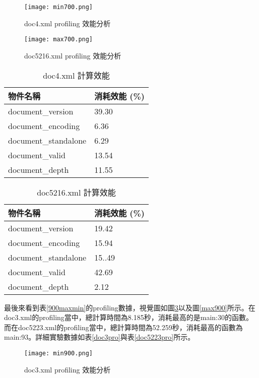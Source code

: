 \begin{figure}[H]
\centering
\graphicspath{{/Users/FUDA/Documents/masterThesis/image/}}
\texttt{[image: min700.png]}
\caption{doc4.xml profiling 效能分析}
\label{min700}
\end{figure}

\begin{figure}[H]
\centering
\graphicspath{{/Users/FUDA/Documents/masterThesis/image/}}
\texttt{[image: max700.png]}
\caption{doc5216.xml profiling 效能分析}
\label{max700}
\end{figure}


\begin{table}[H]
\caption{doc4.xml 計算效能}
\label{doc4pro}
\begin{center}
\begin{tabular}{|p{4cm}<{\centering}|p{3cm}<{\centering}|}
\hline
物件名稱 & 消耗效能 (\%)\\
\hline
document\_version & 39.30 \\
\hline
document\_encoding & 6.36 \\
\hline
document\_standalone & 6.29 \\
\hline
document\_valid & 13.54 \\
\hline
document\_depth & 11.55 \\
\hline
\end{tabular}
\end{center}
\end{table}

\begin{table}[H]
\caption{doc5216.xml 計算效能}
\label{doc52162pro}
\begin{center}
\begin{tabular}{|p{4cm}<{\centering}|p{3cm}<{\centering}|}
\hline
物件名稱 & 消耗效能 (\%)\\
\hline
document\_version & 19.42 \\
\hline
document\_encoding & 15.94 \\
\hline
document\_standalone & 15..49 \\
\hline
document\_valid & 42.69 \\
\hline
document\_depth & 2.12 \\
\hline
\end{tabular}
\end{center}
\end{table}
最後來看到表\ref{900maxmin}的profiling數據，視覺圖如圖\ref{min900}以及圖\ref{max900}所示。在doc3.xml的profiling當中，總計算時間為8.185秒，消耗最高的是main:30的函數。而在doc5223.xml的profiling當中，總計算時間為52.259秒，消耗最高的函數為main:93。詳細實驗數據如表\ref{doc3pro}與表\ref{doc5223pro}所示。
\begin{figure}[H]
\centering
\graphicspath{{/Users/FUDA/Documents/masterThesis/image/}}
\texttt{[image: min900.png]}
\caption{doc3.xml profiling 效能分析}
\label{min900}
\end{figure}

